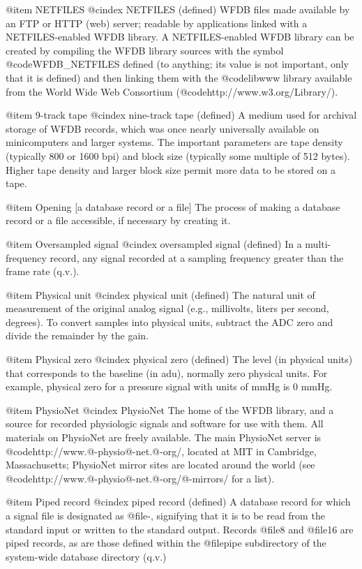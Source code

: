 {{{{{{{{{@item NETFILES
@cindex NETFILES (defined)
WFDB files made available by an FTP or HTTP (web) server;  readable
by applications linked with a NETFILES-enabled WFDB library.  A
NETFILES-enabled WFDB library can be created by compiling the WFDB
library sources with the symbol @code{WFDB_NETFILES} defined (to anything;
its value is not important, only that it is defined) and then linking
them with the @code{libwww} library available from the World Wide Web
Consortium (@code{http://www.w3.org/Library/}).

@item 9-track tape
@cindex nine-track tape (defined)
A medium used for archival storage of WFDB records, which was once nearly
universally available on minicomputers and larger systems.  The
important parameters are tape density (typically 800 or 1600 bpi) and
block size (typically some multiple of 512 bytes).  Higher tape density
and larger block size permit more data to be stored on a tape.

@item Opening [a database record or a file]
The process of making a database record or a file accessible, if
necessary by creating it.

@item Oversampled signal
@cindex oversampled signal (defined)
In a multi-frequency record, any signal recorded at a sampling frequency
greater than the frame rate (q.v.).

@item Physical unit
@cindex physical unit (defined)
The natural unit of measurement of the original analog signal (e.g.,
millivolts, liters per second, degrees).  To convert samples into
physical units, subtract the ADC zero and divide the remainder by the
gain.

@item Physical zero
@cindex physical zero (defined)
The level (in physical units) that corresponds to the baseline (in adu),
normally zero physical units.  For example, physical zero for a pressure
signal with units of mmHg is 0 mmHg.

@item PhysioNet
@cindex PhysioNet
The home of the WFDB library, and a source for recorded physiologic signals and
software for use with them.  All materials on PhysioNet are freely available.
The main PhysioNet server is @code{http://www.@-physio@-net.@-org/}, located at
MIT in Cambridge, Massachusetts; PhysioNet mirror sites are located around the
world (see @code{http://www.@-physio@-net.@-org/@-mirrors/} for a list).

@item Piped record
@cindex piped record (defined)
A database record for which a signal file is designated as @file{-},
signifying that it is to be read from the standard input or written to
the standard output.  Records @file{8} and @file{16} are piped
records, as are those defined within the @file{pipe} subdirectory of
the system-wide database directory (q.v.)

}}}}}}}}}
